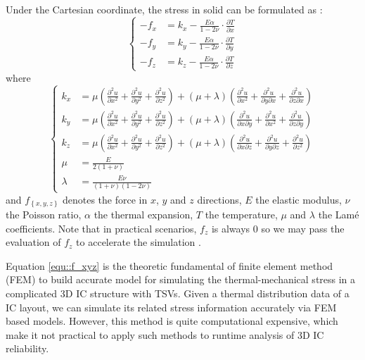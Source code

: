 Under the Cartesian coordinate, the stress in solid can be formulated as \cite{Chen2013Numerical}:
\begin{equation} \label{equ::f_xyz}
\left\{
    \begin{array}{rl}
    -f_x &={} k_x - \frac{E\alpha}{1-2\nu}\cdot\frac{\partial T}{\partial x} \\
    -f_y &={} k_y - \frac{E\alpha}{1-2\nu}\cdot\frac{\partial T}{\partial y} \\
    -f_z &={} k_z - \frac{E\alpha}{1-2\nu}\cdot\frac{\partial T}{\partial z}
    \end{array}
\right.
\end{equation}
where
\begin{equation*}
\left\{
    \begin{array}{rl}
    k_x &= \mu \left( \frac{\partial^2u}{\partial x^2} + \frac{\partial^2u}{\partial y^2} + \frac{\partial^2u}{\partial z^2} \right) 
          + \left( \mu + \lambda \right) \left( \frac{\partial^2u}{\partial x^2} + \frac{\partial^2u}{\partial y \partial x} + \frac{\partial^2u}{\partial z\partial x} \right) \\
    k_y &= \mu \left( \frac{\partial^2u}{\partial x^2} + \frac{\partial^2u}{\partial y^2} + \frac{\partial^2u}{\partial z^2} \right) 
          + \left( \mu + \lambda \right) \left( \frac{\partial^2u}{\partial x \partial y} + \frac{\partial^2u}{\partial x^2} + \frac{\partial^2u}{\partial z\partial y} \right) \\
    k_z &= \mu \left( \frac{\partial^2u}{\partial x^2} + \frac{\partial^2u}{\partial y^2} + \frac{\partial^2u}{\partial z^2} \right) 
          + \left( \mu + \lambda \right) \left( \frac{\partial^2u}{\partial x \partial z} + \frac{\partial^2u}{\partial y \partial z} + \frac{\partial^2u}{\partial z^2} \right) \\
    \mu &= \frac{E}{2(1+\nu)} \\
    \lambda &= \frac{E\nu}{(1+\nu)(1-2\nu)}
    \end{array}
\right.
\end{equation*}
and $f_{\left\{ x,y,z \right\}}$ denotes the force in $x$, $y$ and $z$ directions, $E$ the elastic
modulus, $\nu$ the Poisson ratio, $\alpha$ the thermal expansion, $T$ the temperature, $\mu$ and
$\lambda$ the Lam\'e coefficients. Note that in practical scenarios, $f_z$ is always $0$ so we may
pass the evaluation of $f_z$ to accelerate the simulation \cite{Marella2015A}.

Equation \ref{equ::f_xyz} is the theoretic fundamental of finite element method (FEM) to build accurate model for simulating the
thermal-mechanical stress in a complicated 3D IC structure with TSVs. Given a thermal distribution
data of a IC layout, we can simulate its related stress information accurately via FEM based models.
However, this method is quite computational expensive, which make it not practical to apply
such methods to runtime analysis of 3D IC reliability.


